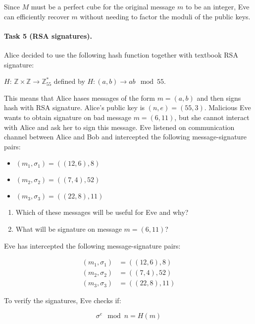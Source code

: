 \documentclass{article}
\begin{document}
Since \( M \) must be a perfect cube for the original message \( m \) to be an integer, Eve can efficiently recover \( m \) without needing to factor the moduli of the public keys.



\paragraph{Task 5 (RSA signatures).} Alice decided to use the following hash function together with textbook RSA signature:
\begin{center}
    $H$: $\mathbb{Z} \times \mathbb{Z} \rightarrow \mathbb{Z}^*_{55}$ defined by $H: (a,b) \rightarrow ab \mod{55}$.
\end{center}
This means that Alice hases messages of the form $m = (a,b)$ and then signs hash with RSA signature. Alice's public key is $(n,e) = (55,3)$.
Malicious Eve wants to obtain signature on bad message $m = (6,11)$, but she cannot interact with Alice and ask her to sign this message.
Eve listened on communication channel between Alice and Bob and intercepted the following message-signature pairs:
\begin{itemize}
    \item $(m_1, \sigma_1) = ((12,6), 8)$
    \item $(m_2, \sigma_2) = ((7,4), 52)$
    \item $(m_3, \sigma_3) = ((22,8), 11)$
\end{itemize}

\begin{enumerate}
    \item Which of these messages will be useful for Eve and why? 
    \item What will be signature on message $m = (6,11)$?
\end{enumerate}

Eve has intercepted the following message-signature pairs:

\begin{align*}
(m_1, \sigma_1) &= ((12, 6), 8) \\
(m_2, \sigma_2) &= ((7, 4), 52) \\
(m_3, \sigma_3) &= ((22, 8), 11)
\end{align*}

To verify the signatures, Eve checks if:

\begin{equation*}
    \sigma^e \mod n = H(m)
\end{equation*}
\end{document}
